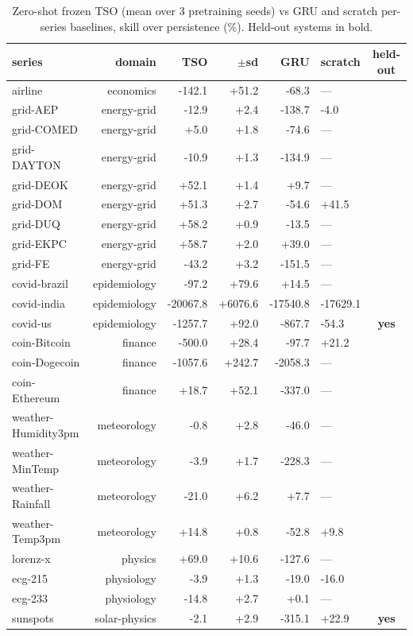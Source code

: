\documentclass[11pt]{article}
\begin{document}
\begin{table}[h]
\centering\small
\caption{Zero-shot frozen TSO (mean over 3 pretraining seeds) vs GRU and
scratch per-series baselines, skill over persistence (\%). Held-out systems
in bold.}
\label{tab:series}
\begin{tabular}{lrrrrlc}
\toprule
series & domain & TSO & $\pm$sd & GRU & scratch & held-out \\
\midrule
airline & economics & -142.1 & +51.2 & -68.3 & --- & \\
grid-AEP & energy-grid & -12.9 & +2.4 & -138.7 & -4.0 & \\
grid-COMED & energy-grid & +5.0 & +1.8 & -74.6 & --- & \\
grid-DAYTON & energy-grid & -10.9 & +1.3 & -134.9 & --- & \\
grid-DEOK & energy-grid & +52.1 & +1.4 & +9.7 & --- & \\
grid-DOM & energy-grid & +51.3 & +2.7 & -54.6 & +41.5 & \\
grid-DUQ & energy-grid & +58.2 & +0.9 & -13.5 & --- & \\
grid-EKPC & energy-grid & +58.7 & +2.0 & +39.0 & --- & \\
grid-FE & energy-grid & -43.2 & +3.2 & -151.5 & --- & \\
covid-brazil & epidemiology & -97.2 & +79.6 & +14.5 & --- & \\
covid-india & epidemiology & -20067.8 & +6076.6 & -17540.8 & -17629.1 & \\
covid-us & epidemiology & -1257.7 & +92.0 & -867.7 & -54.3 & \textbf{yes}\\
coin-Bitcoin & finance & -500.0 & +28.4 & -97.7 & +21.2 & \\
coin-Dogecoin & finance & -1057.6 & +242.7 & -2058.3 & --- & \\
coin-Ethereum & finance & +18.7 & +52.1 & -337.0 & --- & \\
weather-Humidity3pm & meteorology & -0.8 & +2.8 & -46.0 & --- & \\
weather-MinTemp & meteorology & -3.9 & +1.7 & -228.3 & --- & \\
weather-Rainfall & meteorology & -21.0 & +6.2 & +7.7 & --- & \\
weather-Temp3pm & meteorology & +14.8 & +0.8 & -52.8 & +9.8 & \\
lorenz-x & physics & +69.0 & +10.6 & -127.6 & --- & \\
ecg-215 & physiology & -3.9 & +1.3 & -19.0 & -16.0 & \\
ecg-233 & physiology & -14.8 & +2.7 & +0.1 & --- & \\
sunspots & solar-physics & -2.1 & +2.9 & -315.1 & +22.9 & \textbf{yes}\\
\bottomrule
\end{tabular}
\end{table}
\end{document}
